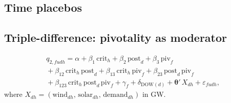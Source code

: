 \documentclass[11pt,a4paper]{article}
\begin{document}
\subsection{Time placebos}\label{app:time_placebos}


\subsection{Triple-difference: pivotality as moderator}\label{app:firm_ddd}

%

\begin{multline}\label{eq:ddd}
   q_{2,fudh} = \alpha + \beta_1\,\mathrm{crit}_h + \beta_2\,\mathrm{post}_d + \beta_3\,\mathrm{piv}_f \\
   {}+ \beta_{12}\,\mathrm{crit}_h\,\mathrm{post}_d + \beta_{13}\,\mathrm{crit}_h\,\mathrm{piv}_f + \beta_{23}\,\mathrm{post}_d\,\mathrm{piv}_f \\
   {}+ \beta_{123}\,\mathrm{crit}_h\,\mathrm{post}_d\,\mathrm{piv}_f + \gamma_f + \delta_{\mathrm{DOW}(d)} + \boldsymbol{\theta}'\,X_{dh} + \varepsilon_{fudh},
\end{multline}
where $X_{dh} = (\text{wind}_{dh},\,\text{solar}_{dh},\,\text{demand}_{dh})$ in GW.
\end{document}
